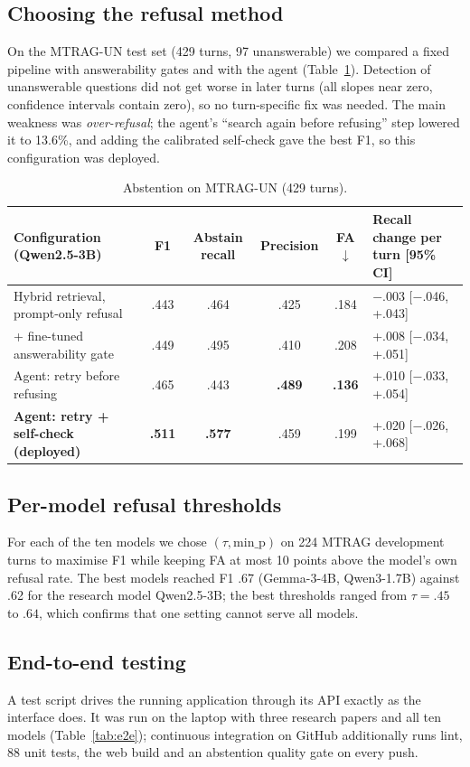 \documentclass[10pt]{article}
\begin{document}
\subsection{Choosing the refusal method}
On the MTRAG-UN test set (429 turns, 97 unanswerable) we compared a fixed pipeline with answerability gates and with the agent (Table~\ref{tab:method}). Detection of unanswerable questions did not get worse in later turns (all slopes near zero, confidence intervals contain zero), so no turn-specific fix was needed. The main weakness was \emph{over-refusal}; the agent's ``search again before refusing'' step lowered it to 13.6\%, and adding the calibrated self-check gave the best F1, so this configuration was deployed.

\begin{table}[H]
\centering\small
\begin{tabular}{@{}lccccl@{}}
\toprule
Configuration (Qwen2.5-3B) & F1 & Abstain recall & Precision & FA $\downarrow$ & Recall change per turn [95\% CI] \\
\midrule
Hybrid retrieval, prompt-only refusal & .443 & .464 & .425 & .184 & $-$.003 [$-$.046, +.043] \\
+ fine-tuned answerability gate & .449 & .495 & .410 & .208 & +.008 [$-$.034, +.051] \\
Agent: retry before refusing & .465 & .443 & \textbf{.489} & \textbf{.136} & +.010 [$-$.033, +.054] \\
\textbf{Agent: retry + self-check (deployed)} & \textbf{.511} & \textbf{.577} & .459 & .199 & +.020 [$-$.026, +.068] \\
\bottomrule
\end{tabular}
\caption{Abstention on MTRAG-UN (429 turns).}
\label{tab:method}
\end{table}
\vspace{-6pt}

\subsection{Per-model refusal thresholds}
For each of the ten models we chose $(\tau,\text{min\_p})$ on 224 MTRAG development turns to maximise F1 while keeping FA at most 10 points above the model's own refusal rate. The best models reached F1 .67 (Gemma-3-4B, Qwen3-1.7B) against .62 for the research model Qwen2.5-3B; the best thresholds ranged from $\tau=.45$ to $.64$, which confirms that one setting cannot serve all models.

\subsection{End-to-end testing}
A test script drives the running application through its API exactly as the interface does. It was run on the laptop with three research papers and all ten models (Table~\ref{tab:e2e}); continuous integration on GitHub additionally runs lint, 88 unit tests, the web build and an abstention quality gate on every push.
\end{document}
